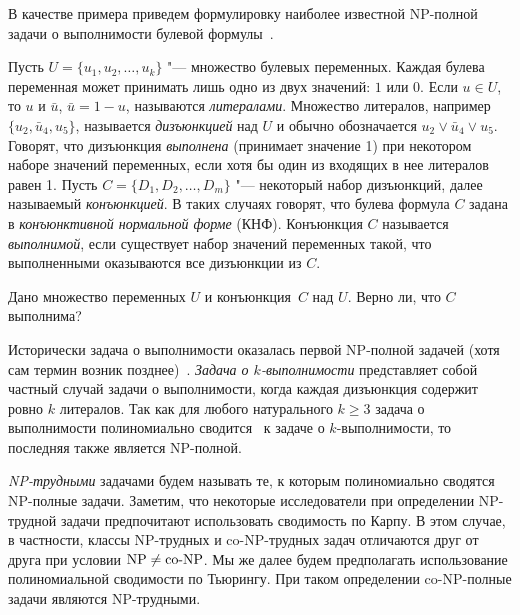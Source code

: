 
В качестве примера приведем формулировку наиболее известной NP-полной задачи о выполнимости булевой формулы~\cite[с.~56]{Garey:1982}.

Пусть $U = \{u_1, u_2, \ldots, u_k\}$ "---
множество булевых переменных. 
Каждая булева переменная может принимать лишь одно из двух значений: 
$1$ или $0$.
Если $u\in U$, то $u$ и $\bar{u}$, $\bar{u} = 1 - u$, называются \emph{литералами}.
Множество литералов, например $\{u_2, \bar{u}_4, u_5\}$,
называется \emph{дизъюнкцией} над $U$ и обычно обозначается $u_2 \vee \bar{u}_4 \vee u_5$.
Говорят, что дизъюнкция \emph{выполнена} (принимает значение 1) при некотором наборе значений переменных, если хотя бы один из входящих в нее литералов
равен 1.
Пусть $C = \{D_1, D_2, \ldots, D_m\}$ "--- некоторый набор дизъюнкций, далее называемый \emph{конъюнкцией}.
В таких случаях говорят, что булева формула $C$ задана в \emph{конъюнктивной нормальной форме}\label{def:CNF} (КНФ).
Конъюнкция $C$ называется \emph{выполнимой}, если существует набор значений переменных такой, что выполненными оказываются все дизъюнкции из $C$.
\medskip

Дано множество переменных $U$ и конъюнкция~$C$ над $U$.
Верно ли, что $C$ выполнима?
\medskip

Исторически задача о выполнимости оказалась первой NP-полной задачей (хотя сам термин возник позднее)~\cite{Cook:1971}.
\emph{Задача о $k$-выполнимости} представляет собой частный случай задачи о выполнимости, когда каждая дизъюнкция содержит ровно $k$ литералов.
Так как для любого натурального $k \ge 3$ задача о выполнимости полиномиально сводится~\cite{Karp:1972} к задаче о $k$-выполнимости, то последняя также является NP-полной.

\emph{NP-трудными} задачами будем называть те, к которым полиномиально сводятся NP-полные задачи.
Заметим, что некоторые исследователи при определении NP-трудной задачи предпочитают использовать сводимость по Карпу. 
В этом случае, в частности, классы NP-трудных и co-NP-трудных задач отличаются друг от друга при условии $\textup{NP} \ne \textup{co-NP}$.
Мы же далее будем предполагать использование полиномиальной сводимости по Тьюрингу. 
При таком определении co-NP-полные задачи являются NP-трудными.

